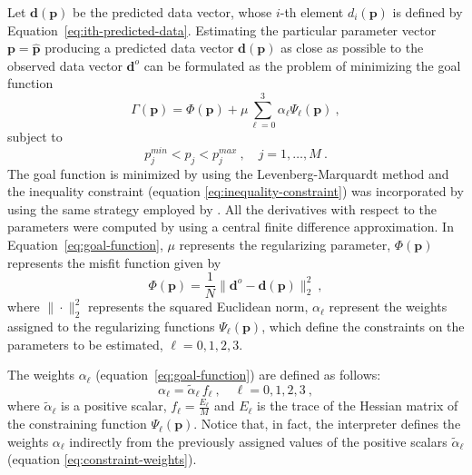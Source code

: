 \documentclass[manuscript]{geophysics}
\begin{document}
Let $\mathbf{d}(\mathbf{p})$ be the predicted data vector, whose $i$-th element
$d_{i}(\mathbf{p})$ is defined by Equation~\ref{eq:ith-predicted-data}. Estimating the
particular parameter vector $\mathbf{p} = \hat{\mathbf{p}}$ producing a predicted data
vector $\mathbf{d}(\mathbf{p})$ as close as possible to the observed data vector 
$\mathbf{d}^{o}$ can be formulated as the problem of minimizing the goal function
\begin{equation}
\Gamma (\mathbf{p}) = \Phi(\mathbf{p}) + \mu \sum_{\ell = 0}^{3} \alpha_{\ell}
\Psi_{\ell}(\mathbf{p}) \: ,
\label{eq:goal-function}
\end{equation}
subject to 
\begin{equation}
p_{j}^{min} < p_{j} < p_{j}^{max} \: , \quad j = 1, \dots, M \: .
\label{eq:inequality-constraint}
\end{equation}
The goal function is minimized by using the Levenberg-Marquardt method \citep{aster-etal2005}
and the inequality constraint (equation \ref{eq:inequality-constraint}) was
incorporated by using the same strategy employed by \citet{barbosa-etal1999}.
All the derivatives with respect to the parameters were computed by using a
central finite difference approximation.
In Equation~\ref{eq:goal-function}, $\mu$ represents the regularizing parameter, 
$\Phi(\mathbf{p})$ represents the misfit function given by
\begin{equation}
\Phi(\mathbf{p}) = \frac{1}{N} \| \mathbf{d}^{o} - \mathbf{d}(\mathbf{p}) \|_{2}^{2} 
\: , 
\label{eq:misfit-function}
\end{equation}
where $\| \cdot \|_{2}^{2}$ represents the squared Euclidean norm, $\alpha_{\ell}$
represent the weights assigned to the regularizing functions $\Psi_{\ell}(\mathbf{p})$,
which define the constraints on the parameters to be estimated, $\ell = 0, 1, 2, 3$.

The weights $\alpha_{\ell}$ (equation~\ref{eq:goal-function}) are defined as follows:
\begin{equation}
\alpha_{\ell} = \tilde{\alpha}_{\ell} \, f_{\ell} \: , \quad \ell = 0, 1, 2, 3 \: ,
\label{eq:constraint-weights}
\end{equation}
where $\tilde{\alpha}_{\ell}$ is a positive scalar, $f_{\ell} = \frac{E_{\ell}}{M}$ and
$E_{\ell}$ is the trace of the Hessian matrix of the constraining function
$\Psi_{\ell}(\mathbf{p})$. Notice that, in fact, the interpreter defines the
weights $\alpha_{\ell}$ indirectly from the previously assigned values of the 
positive scalars $\tilde{\alpha}_{\ell}$ (equation \ref{eq:constraint-weights}).
\end{document}
